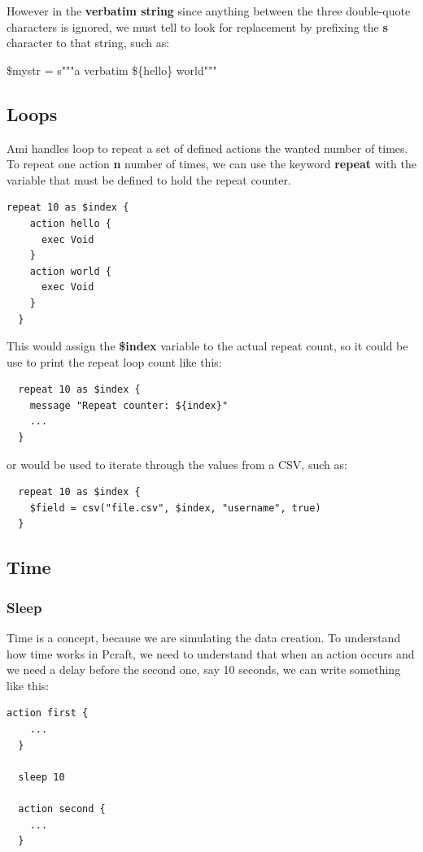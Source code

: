 \documentclass[10pt]{article}
\begin{document}
However in the \textbf{verbatim string} since anything between the three double-quote characters is ignored, we must tell to look for replacement by prefixing the \textbf{s} character to that string, such as:
\begin{center}
  \$mystr = s"""a verbatim \$\{hello\} world"""
\end{center}

\subsection{Loops}

Ami handles loop to repeat a set of defined actions the wanted number of times. To repeat one action \textbf{n} number of times, we can use the keyword \textbf{repeat} with the variable that must be defined to hold the repeat counter.

\begin{lstlisting}[caption={Repeat loop},captionpos=b]
  repeat 10 as $index {
    action hello {      
      exec Void
    }
    action world {      
      exec Void
    }    
  }
\end{lstlisting}

This would assign the \textbf{\$index} variable to the actual repeat count, so it could be use to print the repeat loop count like this:
\begin{lstlisting}
  repeat 10 as $index {
    message "Repeat counter: ${index}"
    ...
  }
\end{lstlisting}

or would be used to iterate through the values from a CSV, such as:

\begin{lstlisting}
  repeat 10 as $index {
    $field = csv("file.csv", $index, "username", true)
  }
\end{lstlisting}

\subsection{Time}

\subsubsection{Sleep}
Time is a concept, because we are simulating the data creation. To understand how time works in Pcraft, we need to understand that when an action occurs and we need a delay before the second one, say 10 seconds, we can write something like this:
\begin{lstlisting}[caption={Time Introduction},captionpos=b]
  action first {
    ...
  }

  sleep 10

  action second {
    ...
  }
\end{lstlisting}
\end{document}
